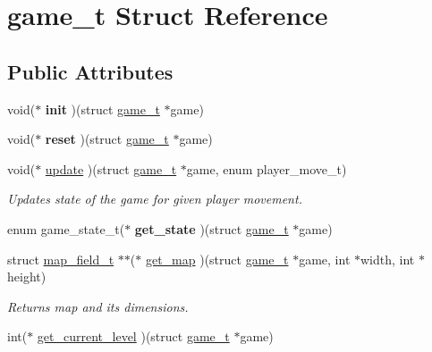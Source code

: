 \hypertarget{structgame__t}{}\section{game\+\_\+t Struct Reference}
\label{structgame__t}
\subsection*{Public Attributes}
\begin{DoxyCompactItemize}
\item 
void($\ast$ {\bfseries init} )(struct \hyperlink{structgame__t}{game\+\_\+t} $\ast$game)\hypertarget{structgame__t_a6eeeedf44cd55461d5d5a7a701110611}{}\label{structgame__t_a6eeeedf44cd55461d5d5a7a701110611}

\item 
void($\ast$ {\bfseries reset} )(struct \hyperlink{structgame__t}{game\+\_\+t} $\ast$game)\hypertarget{structgame__t_ab95cfede154ea708d2c01be106bf3116}{}\label{structgame__t_ab95cfede154ea708d2c01be106bf3116}

\item 
void($\ast$ \hyperlink{structgame__t_aa163bbf56e62507ceff2c39cbffe301b}{update} )(struct \hyperlink{structgame__t}{game\+\_\+t} $\ast$game, enum player\+\_\+move\+\_\+t)\hypertarget{structgame__t_aa163bbf56e62507ceff2c39cbffe301b}{}\label{structgame__t_aa163bbf56e62507ceff2c39cbffe301b}

\begin{DoxyCompactList}\small\item\em Updates state of the game for given player movement. \end{DoxyCompactList}\item 
enum game\+\_\+state\+\_\+t($\ast$ {\bfseries get\+\_\+state} )(struct \hyperlink{structgame__t}{game\+\_\+t} $\ast$game)\hypertarget{structgame__t_ae441c1398379541b60807795fd269a1c}{}\label{structgame__t_ae441c1398379541b60807795fd269a1c}

\item 
struct \hyperlink{structmap__field__t}{map\+\_\+field\+\_\+t} $\ast$$\ast$($\ast$ \hyperlink{structgame__t_a41d009bbe7b429a2657d012b94778c92}{get\+\_\+map} )(struct \hyperlink{structgame__t}{game\+\_\+t} $\ast$game, int $\ast$width, int $\ast$height)
\begin{DoxyCompactList}\small\item\em Returns map and its dimensions. \end{DoxyCompactList}\item 
int($\ast$ \hyperlink{structgame__t_ad13e2c09f4e825c907f6294eb4a50557}{get\+\_\+current\+\_\+level} )(struct \hyperlink{structgame__t}{game\+\_\+t} $\ast$game)\hypertarget{structgame__t_ad13e2c09f4e825c907f6294eb4a50557}{}\label{structgame__t_ad13e2c09f4e825c907f6294eb4a50557}


\end{DoxyCompactItemize}
